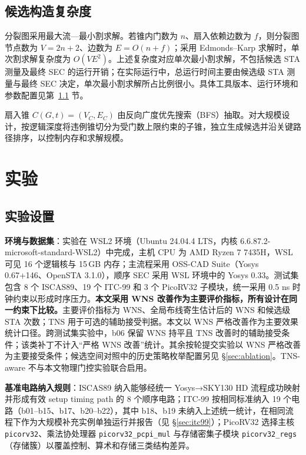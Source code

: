 \documentclass[twocolumn,10pt,fontset=windows]{ctexart}
\begin{document}
\subsection{候选构造复杂度}\label{sec:impl}

分裂图采用最大流—最小割求解。若锥内门数为 $n$、扇入依赖边数为 $f$，则分裂图节点数为 $V=2n+2$、边数为 $E=O(n+f)$；采用 Edmonds--Karp 求解时，单次割求解复杂度为 $O(VE^2)$。上述复杂度对应单次最小割求解，不包括候选 STA 测量及最终 SEC 的运行开销；在实际运行中，总运行时间主要由候选级 STA 测量与最终 SEC 决定，单次最小割求解所占比例很小。具体工具版本、运行环境和参数配置见第~\ref{sec:setup} 节。

扇入锥 $C(G, t) = (V_C, E_C)$ 由反向广度优先搜索（BFS）抽取。对大规模设计，按逻辑深度将违例锥切分为受门数上限约束的子锥，独立生成候选并沿关键路径排序，以控制内存和求解规模。

\section{实验}\label{sec:exp}

\subsection{实验设置}\label{sec:setup}

\textbf{环境与数据集}：实验在 WSL2 环境（Ubuntu 24.04.4 LTS，内核 6.6.87.2-microsoft-standard-WSL2）中完成，主机 CPU 为 AMD Ryzen 7 7435H，WSL 可见 16 个逻辑核与 15\,GB 内存；主流程采用 OSS-CAD Suite（Yosys 0.67+146、OpenSTA 3.1.0），顺序 SEC 采用 WSL 环境中的 Yosys 0.33。测试集包含 8 个 ISCAS89、19 个 ITC-99 和 3 个 PicoRV32 子模块，统一采用 0.5 ns 时钟约束以形成时序压力。\textbf{本文采用 WNS 改善作为主要评价指标，所有设计在同一约束下比较。}主要评价指标为 WNS、全局布线寄生估计后的 WNS 和候选级 STA 次数；TNS 用于可选的辅助接受判据。本文以 WNS 严格改善作为主要效果统计口径。跨测试集实验中，b06 保留 WNS 持平且 TNS 改善时的辅助接受条件；该类补丁不计入“严格 WNS 改善”统计。其余按轮提交实验以 WNS 严格改善为主要接受条件；候选空间对照中的历史策略枚举配置另见 \S\ref{sec:ablation}。TNS-aware 不与本文物理门控实验联合启用。

\textbf{基准电路纳入规则}：ISCAS89 纳入能够经统一 Yosys→SKY130 HD 流程成功映射并形成有效 setup timing path 的 8 个顺序电路；ITC-99 按相同标准纳入 19 个电路（b01--b15、b17、b20--b22），其中 b18、b19 未纳入上述统一统计，在相同流程下作为大规模补充实例单独运行并报告（见 \S\ref{sec:itc99}）；PicoRV32 选择主核 \texttt{picorv32}、乘法协处理器 \texttt{picorv32\_pcpi\_mul} 与存储密集子模块 \texttt{picorv32\_regs}（存储簇）以覆盖控制、算术和存储三类结构差异。
\end{document}
